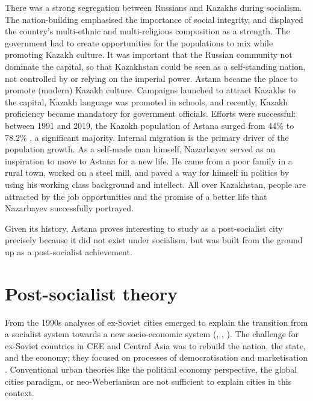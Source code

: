 \documentclass{article}
\begin{document}
There was a strong segregation between Russians and Kazakhs during socialism. The nation-building emphasised the importance of social integrity, and displayed the country's multi-ethnic and multi-religious composition as a strength. The government had to create opportunities for the populations to mix while promoting Kazakh culture. It was important that the Russian community not dominate the capital, so that Kazakhstan could be seen as a self-standing nation, not controlled by or relying on the imperial power. 
Astana became the place to promote (modern) Kazakh culture. 
Campaigns launched to attract Kazakhs to the capital, Kazakh language was promoted in schools, and recently, Kazakh proficiency became mandatory for government officials. Efforts were successful: between 1991 and 2019, the Kazakh population of Astana surged from 44\% to 78.2\% \parencite{unfpa2020wekazakhstan}, a significant majority. 
Internal migration is the primary driver of the population growth. As a self-made man himself, Nazarbayev served as an inspiration to move to Astana for a new life. He came from a poor family in a rural town, worked on a steel mill, and paved a way for himself in politics by using his working class background and intellect. All over Kazakhstan, people are attracted by the job opportunities and the promise of a better life that Nazarbayev successfully portrayed.

Given its history, Astana proves interesting to study as a post-socialist city precisely because it did not exist under socialism, but was built from the ground up as a post-socialist achievement.

\section{Post-socialist theory}

From the 1990s analyses of ex-Soviet cities emerged to explain the transition from a socialist system towards a new socio-economic system (\cite{smith1996socialist}, \cite{sailer1999characteristics}, \cite{hirt2013whatever}). The challenge for ex-Soviet countries in CEE and Central Asia was to rebuild the nation, the state, and the economy; they focused on processes of democratisation and marketisation \parencite{ferenvcuhova2016introduction}. 
Conventional urban theories like the political economy perspective, the global cities paradigm, or neo-Weberianism \parencite{haussermann2005european} are not sufficient to explain cities in this context.
\end{document}
